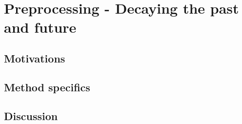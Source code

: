 \chapter{Preprocessing - Decaying the past and future}
\label{ch:preprocess}

\section{Motivations}

\section{Method specifics}

\section{Discussion}
